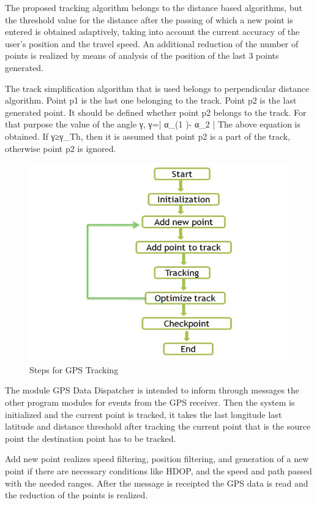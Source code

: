 \documentclass[12pt,a4paper]{article}
\begin{document}
\hspace{0.7cm} The proposed tracking algorithm belongs to the distance based algorithms, but the threshold value for the distance after the passing of which a new point is entered is obtained adaptively, taking into account the current accuracy of the user’s position and the travel speed. An additional reduction of the number of points is realized by means of analysis of the position of the last 3 points generated.

The track simplification algorithm that is used belongs to perpendicular distance algorithm.
Point p1 is the last one belonging to the track. Point p2 is the last generated point. It should be defined whether point p2 belongs to the track. For that purpose the value of the angle γ, γ=| α_(1  )-  α_2  |
 The above equation is obtained. If γ≥γ_Th, then it is assumed that point p2 is a part of the track, otherwise point p2 is ignored.

\begin{figure}[!htb]
\centering
\includegraphics[width=10.5 cm]{flowchart}
\caption{Steps for GPS Tracking}
\end{figure}

\hspace{0.7cm}The module GPS Data Dispatcher is intended to inform through messages the other program modules for events from the GPS receiver. Then the system is initialized and the current point is tracked, it takes the last longitude last latitude and distance threshold after tracking the current point that is the source point the destination point has to be tracked.

	Add new point realizes speed filtering, position filtering, and generation of a new point if there are necessary conditions like HDOP, and the speed and path passed with the needed ranges. After the message is receipted the GPS data is read and the reduction of the points is realized.
\end{document}
